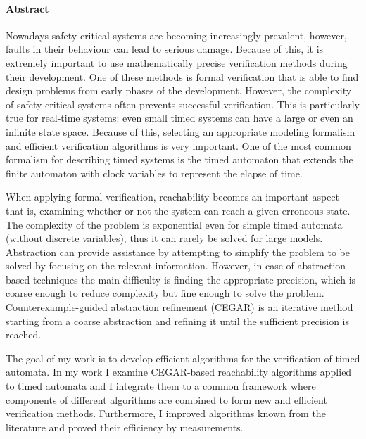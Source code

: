 \cleardoublepage

\paragraph*{Abstract}
{}
\thispagestyle{plain}

Nowadays safety-critical systems are becoming increasingly prevalent, however, faults in their behaviour can lead to serious damage. Because of this, it is extremely important to use mathematically precise verification methods during their development. One of these methods is formal verification that is able to find design problems from early phases of the development. However, the complexity of safety-critical systems often prevents successful verification. This is particularly true for real-time systems: even small timed systems can have a large or even an infinite state space. Because of this, selecting an appropriate modeling formalism and efficient verification algorithms is very important. One of the most common formalism for describing timed systems is the timed automaton that extends the finite automaton with clock variables to represent the elapse of time.


When applying formal verification, reachability becomes an important aspect – that is, examining whether or not the system can reach a given erroneous state. The complexity of the problem is exponential even for simple timed automata (without discrete variables), thus it can rarely be solved for large models. Abstraction can provide assistance by attempting to simplify the problem to be solved by focusing on the relevant information. However, in case of abstraction-based techniques the main difficulty is finding the appropriate precision, which is coarse enough to reduce complexity but fine enough to solve the problem. Counterexample-guided abstraction refinement (CEGAR) is an iterative method starting from a coarse abstraction and refining it until the sufficient precision is reached.


The goal of my work is to develop efficient algorithms for the verification of timed automata. In my work I examine CEGAR-based reachability algorithms applied to timed automata and I integrate them to a common framework where components of different algorithms are combined to form new and efficient verification methods. Furthermore, I improved algorithms known from the literature and proved their efficiency by measurements.


